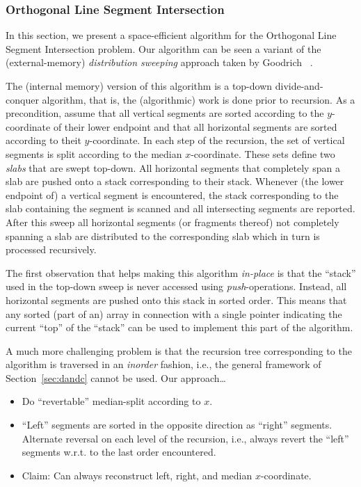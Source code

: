 
\subsubsection{Orthogonal Line Segment Intersection}


In this section, we present a space-efficient algorithm for the
Orthogonal Line Segment Intersection problem. Our algorithm can be
seen a variant of the (external-memory) \emph{distribution sweeping}
approach taken by Goodrich \etal~\cite{goodrich:external}.

The (internal memory) version of this algorithm is a top-down
divide-and-conquer algorithm, that is, the (algorithmic) work is done
prior to recursion. As a precondition, assume that all vertical
segments are sorted according to the $y$-coordinate of their lower
endpoint and that all horizontal segments are sorted according to
theit $y$-coordinate. In each step of the recursion, the set of
vertical segments is split according to the median $x$-coordinate.
These sets define two \emph{slabs} that are swept top-down. All
horizontal segments that completely span a slab are pushed onto a
stack corresponding to their stack. Whenever (the lower endpoint of) a
vertical segment is encountered, the stack corresponding to the slab
containing the segment is scanned and all intersecting segments are
reported. After this sweep all horizontal segments (or fragments
thereof) not completely spanning a slab are distributed to the
corresponding slab which in turn is processed recursively.

The first observation that helps making this algorithm \emph{in-place}
is that the ``stack'' used in the top-down sweep is never accessed
using \emph{push}-operations. Instead, all horizontal segments are
pushed onto this stack in sorted order. This means that any sorted
(part of an) array in connection with a single pointer indicating the
current ``top'' of the ``stack'' can be used to implement this part of
the algorithm.

A much more challenging problem is that the recursion tree
corresponding to the algorithm is traversed in an \emph{inorder}
fashion, i.e., the general framework of Section~\ref{sec:dandc}
cannot be used. Our approach\ldots

\begin{itemize}
\item  Do ``revertable'' median-split according to $x$.
\item  ``Left'' segments are sorted in the opposite direction as 
  ``right'' segments. Alternate reversal on each level of the
  recursion, i.e., always revert the ``left'' segments w.r.t. to the
  last order encountered.
\item Claim: Can always reconstruct left, right, and median
  $x$-coordinate. 
\end{itemize}

